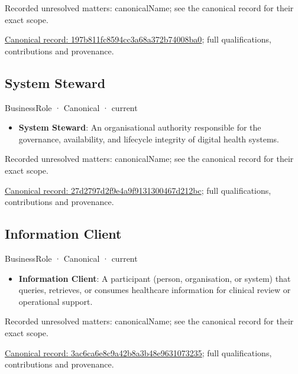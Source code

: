 {\small Recorded unresolved matters: canonicalName; see the canonical record for their exact scope.}\par
{\footnotesize \href{../../../../continuum/business/business-role/197b811fc8594cc3a68a372b74008ba0.md}{Canonical record: 197b811fc8594cc3a68a372b74008ba0}; full qualifications, contributions and provenance.}\par
\subsection{System Steward}

\label{element:27d2797d2f9e4a9f9131300467d212bc}
{\small BusinessRole · Canonical · current}\par

\begin{itemize}


\item \textbf{System Steward}: An organisational authority responsible for the governance, availability, and lifecycle integrity of digital health systems.

\end{itemize}

{\small Recorded unresolved matters: canonicalName; see the canonical record for their exact scope.}\par
{\footnotesize \href{../../../../continuum/business/business-role/27d2797d2f9e4a9f9131300467d212bc.md}{Canonical record: 27d2797d2f9e4a9f9131300467d212bc}; full qualifications, contributions and provenance.}\par
\subsection{Information Client}

\label{element:3ac6ca6e8c9a42b8a3b48e9631073235}
{\small BusinessRole · Canonical · current}\par

\begin{itemize}


\item \textbf{Information Client}: A participant (person, organisation, or system) that queries, retrieves, or consumes healthcare information for clinical review or operational support.

\end{itemize}

{\small Recorded unresolved matters: canonicalName; see the canonical record for their exact scope.}\par
{\footnotesize \href{../../../../continuum/business/business-role/3ac6ca6e8c9a42b8a3b48e9631073235.md}{Canonical record: 3ac6ca6e8c9a42b8a3b48e9631073235}; full qualifications, contributions and provenance.}\par
